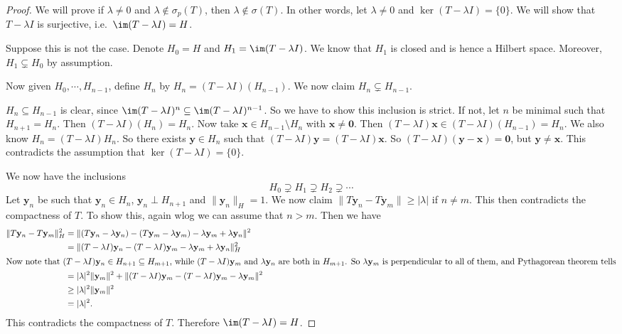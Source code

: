 \documentclass[a4paper]{article}
\begin{document}
\begin{proof}
  We will prove if $\lambda \not= 0$ and $\lambda \not\in \sigma_p(T)$, then $\lambda\not\in \sigma(T)$. In other words, let $\lambda \not= 0$ and $\ker (T - \lambda I) = \{0\}$. We will show that $T - \lambda I$ is surjective, i.e.\ $\im (T - \lambda I) = H$.

  Suppose this is not the case. Denote $H_0 = H$ and $H_1 = \im (T - \lambda I)$. We know that $H_1$ is closed and is hence a Hilbert space. Moreover, $H_1 \subsetneq H_0$ by assumption.

  Now given $H_0, \cdots, H_{n - 1}$, define $H_n$ by $H_n = (T - \lambda I)(H_{n - 1})$. We now claim $H_n \subsetneq H_{n - 1}$.

  $H_n \subseteq H_{n - 1}$ is clear, since $\im (T - \lambda I)^n \subseteq \im (T - \lambda I)^{n - 1}$. So we have to show this inclusion is strict. If not, let $n$ be minimal such that $H_{n + 1} = H_n$. Then $(T - \lambda I)(H_n) = H_n$. Now take $\mathbf{x} \in H_{n - 1} \setminus H_n$ with $\mathbf{x}\not= \mathbf{0}$. Then $(T - \lambda I) \mathbf{x} \in (T - \lambda I)(H_{n - 1}) = H_n$. We also know $H_n = (T - \lambda I)H_n$. So there exists $\mathbf{y} \in H_n$ such that $(T - \lambda I)\mathbf{y} = (T - \lambda I)\mathbf{x}$. So $(T - \lambda I)(\mathbf{y} - \mathbf{x}) = \mathbf{0}$, but $\mathbf{y} \not= \mathbf{x}$. This contradicts the assumption that $\ker(T - \lambda I) = \{0\}$.

  We now have the inclusions
  \[
    H_0 \supsetneq H_1 \supsetneq H_2 \supsetneq \cdots
  \]
  Let $\mathbf{y}_n$ be such that $\mathbf{y}_n \in H_n$, $\mathbf{y}_n \perp H_{n + 1}$ and $\|\mathbf{y}_n\|_H = 1$. We now claim $\|T \mathbf{y}_n - T \mathbf{y}_m\| \geq |\lambda|$ if $n \not= m$. This then contradicts the compactness of $T$. To show this, again wlog we can assume that $n > m$. Then we have
  \begin{align*}
    \|T \mathbf{y}_n - T \mathbf{y}_m\|_H^2 &= \|(T \mathbf{y}_n - \lambda\mathbf{y}_n) - (T \mathbf{y}_m - \lambda\mathbf{y}_m) - \lambda\mathbf{y}_m + \lambda\mathbf{y}_n\|^2\\
    &= \|(T - \lambda I) \mathbf{y}_n - (T - \lambda I) \mathbf{y}_m - \lambda \mathbf{y}_m + \lambda \mathbf{y}_n\|^2_H\\
    \intertext{Now note that $(T - \lambda I)\mathbf{y} _n \in H_{n + 1}\subseteq H_{m + 1}$, while $(T - \lambda I)\mathbf{y}_m$ and $\lambda \mathbf{y}_n$ are both in $H_{m + 1}$. So $\lambda \mathbf{y}_m$ is perpendicular to all of them, and Pythagorean theorem tells}
    &= |\lambda|^2 \|\mathbf{y}_m\|^2 + \|(T - \lambda I)\mathbf{y}_m - (T - \lambda I)\mathbf{y}_m - \lambda \mathbf{y}_m\|^2\\
    &\geq |\lambda|^2 \|\mathbf{y}_m\|^2\\
    &= |\lambda|^2.
  \end{align*}
  This contradicts the compactness of $T$. Therefore $\im (T - \lambda I) = H$.
\end{proof}
\end{document}
